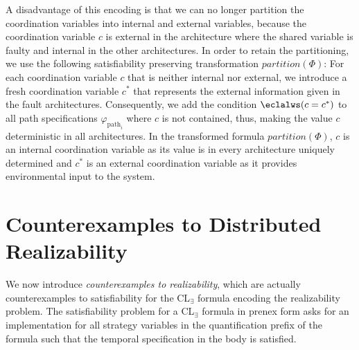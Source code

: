 \documentclass{LMCS}
\newcommand{\partition}{\mathit{partition}}
\theoremstyle{plain}\newtheorem{theorem}[thm]{Theorem}
\theoremstyle{plain}\newtheorem{lemma}[thm]{Lemma}
\theoremstyle{plain}\newtheorem{proposition}[thm]{Proposition}
\theoremstyle{plain}\newtheorem{corollary}[thm]{Corollary}
\theoremstyle{definition}\newtheorem{definition}{Definition}[section]
\begin{document}
A disadvantage of this encoding is that we can no longer partition the coordination variables into internal and external variables, because the 
coordination variable $c$ is external in the architecture where the shared variable is faulty and internal in the other architectures.
In order to retain the partitioning, we use the following satisfiability preserving transformation $\partition(\Phi)$:
For each coordination variable $c$ that is neither internal nor external, we introduce a fresh coordination variable $c^*$ that represents the external information given in the fault architectures.
Consequently, we add the condition $\eclalws (c = c^*)$ to all path specifications $\varphi_{\text{path}_i}$ where $c$ is not contained, thus, making the value $c$ deterministic in all architectures.
In the transformed formula $\partition(\Phi)$, $c$ is an internal coordination variable as its value is in every architecture uniquely determined and $c^*$ is an external coordination variable as it provides environmental input to the system.


\section{Counterexamples to Distributed Realizability} \label{sec:counterexamples}
We now introduce \emph{counterexamples to realizability}, which are actually {counterexamples to satisfiability} for the CL$_\exists$ formula encoding the realizability problem.
The satisfiability problem for a CL$_\exists$ formula in prenex form asks for an implementation for all strategy variables in the quantification prefix of the formula such that the temporal specification in the body is satisfied.
\end{document}
